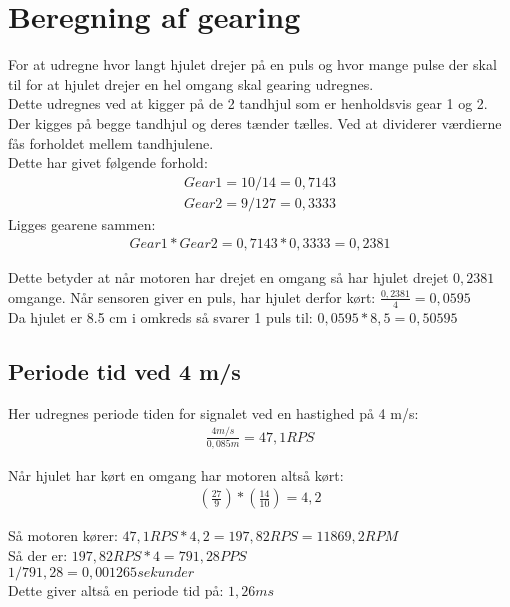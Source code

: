 


\section{Beregning af gearing}
\label{beregn_gear}

For at udregne hvor langt hjulet drejer på en puls og hvor mange pulse der skal til for at hjulet drejer en hel omgang skal gearing udregnes. \\
Dette udregnes ved at kigger på de 2 tandhjul som er henholdsvis gear 1 og 2. Der kigges på begge tandhjul og deres tænder tælles. Ved at dividerer værdierne fås forholdet mellem tandhjulene. \\
Dette har givet følgende forhold:
\begin{align*}
Gear1 = 10 / 14 = 0,7143 \\
Gear2 = 9 / 127 = 0,3333
\end{align*}
Ligges gearene sammen:
\begin{align*}
Gear1*Gear2 = 0,7143 * 0,3333 = 0,2381
\end{align*}

Dette betyder at når motoren har drejet en omgang så har hjulet drejet \(0,2381\) omgange.
Når sensoren giver en puls, har hjulet derfor kørt: \(\frac{0,2381}{4} = 0,0595\) \\
Da hjulet er 8.5 cm i omkreds så svarer 1 puls til: \(0,0595*8,5 = 0,50595\)

\subsection{Periode tid ved 4 m/s}
\label{periode_4ms}
Her udregnes periode tiden for signalet ved en hastighed på 4 m/s:
\begin{align*}
\frac{4m/s}{0,085m} = 47,1 RPS
\end{align*}

Når hjulet har kørt en omgang har motoren altså kørt:
\begin{align*}
(\frac{27}{9}) * (\frac{14}{10}) = 4,2
\end{align*}

Så motoren kører: \(47,1 RPS * 4,2 = 197,82 RPS = 11869,2 RPM \) \\
Så der er: \(197,82 RPS *4 = 791,28 PPS \) \\
\(1/791,28 = 0,001265 sekunder \) \\
Dette giver altså en periode tid på: \(1,26 ms\)

